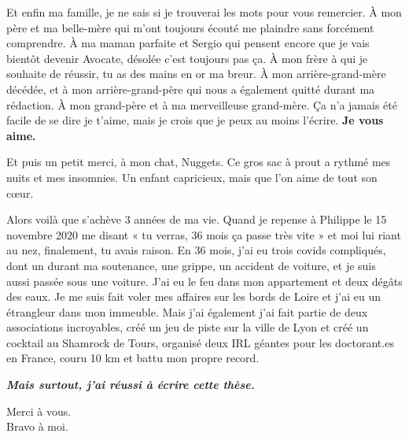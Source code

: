 \par Et enfin ma famille, je ne sais si je trouverai les mots pour vous remercier. À mon père et ma belle-mère qui m’ont toujours écouté me plaindre sans forcément comprendre. À ma maman parfaite et Sergio qui pensent encore que je vais bientôt devenir Avocate, désolée c'est toujours pas ça. À mon frère à qui je souhaite de réussir, tu as des mains en or ma breur. À mon arrière-grand-mère décédée, et à mon arrière-grand-père qui nous a également quitté durant ma rédaction. À mon grand-père et à ma merveilleuse grand-mère. Ça n’a jamais été facile de se dire je t’aime, mais je crois que je peux au moins l’écrire. \textbf{Je vous aime.} 
\par Et puis un petit merci, à mon chat, Nuggets. Ce gros sac à prout a rythmé mes nuits et mes insomnies. Un enfant capricieux, mais que l’on aime de tout son cœur. 
\par Alors voilà que s’achève 3 années de ma vie. Quand je repense à Philippe le 15 novembre 2020 me disant « tu verras, 36 mois ça passe très vite » et moi lui riant au nez, finalement, tu avais raison. En 36 mois, j’ai eu trois covids compliqués, dont un durant ma soutenance, une grippe, un accident de voiture, et je suis aussi passée sous une voiture. J’ai eu le feu dans mon appartement et deux dégâts des eaux. Je me suis fait voler mes affaires sur les bords de Loire et j’ai eu un étrangleur dans mon immeuble. Mais j’ai également j’ai fait partie de deux associations incroyables, créé un jeu de piste sur la ville de Lyon et créé un cocktail au Shamrock de Tours, organisé deux IRL géantes pour les doctorant.es en France, couru 10 km et battu mon propre record. 
\par\textbf{\textit{Mais surtout, j’ai réussi à écrire cette thèse.}}  


\begin{flushright}
Merci à vous.\\
Bravo à moi.
\end{flushright}
\newpage
